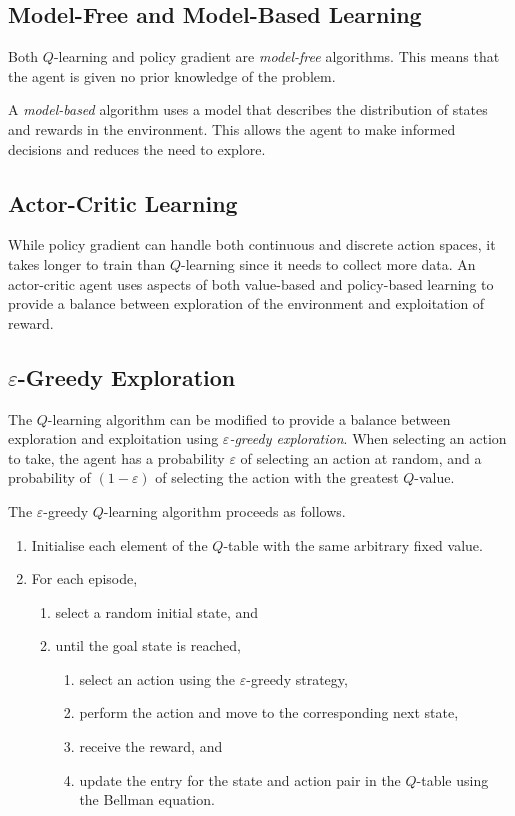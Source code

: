 \subsection{Model-Free and Model-Based Learning}

Both \( Q \)-learning and policy gradient are \emph{model-free} algorithms.
This means that the agent is given no prior knowledge of the problem.

A \emph{model-based} algorithm uses a model that describes the distribution of states and rewards in the environment.
This allows the agent to make informed decisions and reduces the need to explore.

\subsection{Actor-Critic Learning}

While policy gradient can handle both continuous and discrete action spaces, it takes longer to train than \( Q \)-learning since it needs to collect more data.
An actor-critic agent uses aspects of both value-based and policy-based learning to provide a balance between exploration of the environment and exploitation of reward.

\subsection{\texorpdfstring{\( \varepsilon \)}{Epsilon}-Greedy Exploration}

The \( Q \)-learning algorithm can be modified to provide a balance between exploration and exploitation using \emph{\( \varepsilon \)-greedy exploration}.
When selecting an action to take, the agent has a probability \( \varepsilon \) of selecting an action at random, and a probability of \( \left( 1 - \varepsilon \right) \) of selecting the action with the greatest \( Q \)-value.

The \( \varepsilon \)-greedy \( Q \)-learning algorithm proceeds as follows.
\begin{enumerate}
  \item Initialise each element of the \( Q \)-table with the same arbitrary fixed value.
  \item For each episode,
  \begin{enumerate}
    \item select a random initial state, and
    \item until the goal state is reached,
    \begin{enumerate}
      \item select an action using the \( \varepsilon \)-greedy strategy,
      \item perform the action and move to the corresponding next state,
      \item receive the reward, and
      \item update the entry for the state and action pair in the \( Q \)-table using the Bellman equation.
    \end{enumerate}
  \end{enumerate}
\end{enumerate}

